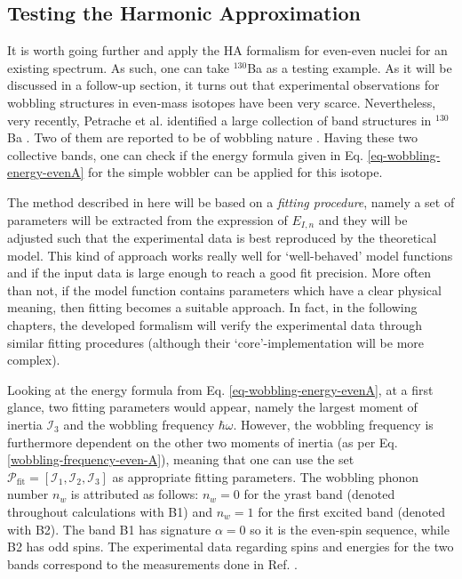 \subsection{Testing the Harmonic Approximation}
\label{ba-130-numerical-calculations}

It is worth going further and apply the HA formalism for even-even nuclei for an existing spectrum. As such, one can take $^{130}$Ba as a testing example. As it will be discussed in a follow-up section, it turns out that experimental observations for wobbling structures in even-mass isotopes have been very scarce. Nevertheless, very recently, Petrache et al. identified a large collection of band structures in $^{130}$Ba \cite{petrache2019diversity}. Two of them are reported to be of wobbling nature \cite{chen2019transverse}. Having these two collective bands, one can check if the energy formula given in Eq. \ref{eq-wobbling-energy-evenA} for the simple wobbler can be applied for this isotope.

The method described in here will be based on a \emph{fitting procedure}, namely a set of parameters will be extracted from the expression of $E_{I,n}$ and they will be adjusted such that the experimental data is best reproduced by the theoretical model. This kind of approach works really well for `well-behaved' model functions and if the input data is large enough to reach a good fit precision. More often than not, if the model function contains parameters which have a clear physical meaning, then fitting becomes a suitable approach. In fact, in the following chapters, the developed formalism will verify the experimental data through similar fitting procedures (although their `core'-implementation will be more complex).

Looking at the energy formula from Eq. \ref{eq-wobbling-energy-evenA}, at a first glance, two fitting parameters would appear, namely the largest moment of inertia $\mathcal{I}_3$ and the wobbling frequency $\hbar\omega$. However, the wobbling frequency is furthermore dependent on the other two moments of inertia (as per Eq. \ref{wobbling-frequency-even-A}), meaning that one can use the set $\mathcal{P}_\text{fit}=\left[\mathcal{I}_1,\mathcal{I}_2,\mathcal{I}_3\right]$ as appropriate fitting parameters. The wobbling phonon number $n_w$ is attributed as follows: $n_w=0$ for the yrast band (denoted throughout calculations with B1) and $n_w=1$ for the first excited band (denoted with B2). The band B1 has signature $\alpha=0$ so it is the even-spin sequence, while B2 has odd spins. The experimental data regarding spins and energies for the two bands correspond to the measurements done in Ref. \cite{petrache2019diversity}.

